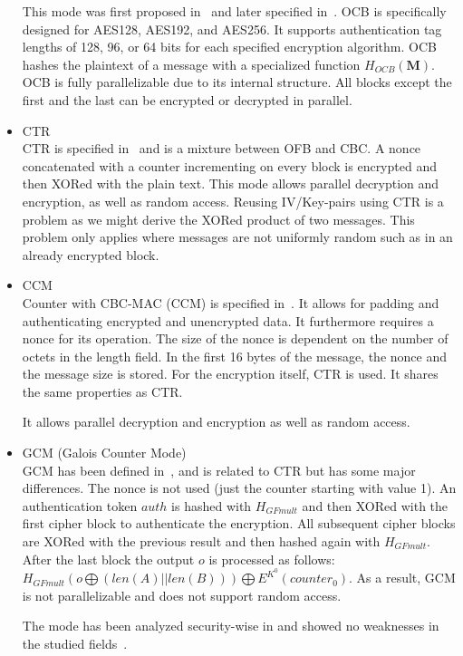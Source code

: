 \begin{itemize}
	This mode was first proposed in~\cite{rogaway2003ocb} and later specified in~\cite{krovetz-ocb-04}. OCB is specifically designed for AES128, AES192, and AES256. It supports authentication tag lengths of 128, 96, or 64 bits for each specified encryption algorithm. OCB hashes the plaintext of a message with a specialized function $H_{OCB}(\mathbf{M})$. OCB is fully parallelizable due to its internal structure. All blocks except the first and the last can be encrypted or decrypted in parallel.
	\item CTR\\
	CTR is specified in~\cite{lipmaa2000ctr} and is a mixture between OFB and CBC. A nonce concatenated with a counter incrementing on every block is encrypted and then XORed with the plain text. This mode allows parallel decryption and encryption, as well as random access. Reusing IV/Key-pairs using CTR is a problem as we might derive the XORed product of two messages. This problem only applies where messages are not uniformly random such as in an already encrypted block.
	\item CCM\\
	Counter with CBC-MAC (CCM) is specified in~\cite{rfc3610}. It allows for padding and authenticating encrypted and unencrypted data. It furthermore requires a nonce for its operation. The size of the nonce is dependent on the number of octets in the length field. In the first 16 bytes of the message, the nonce and the message size is stored. For the encryption itself, CTR is used. It shares the same properties as CTR. 
	
	It allows parallel decryption and encryption as well as random access.
	\item GCM (Galois Counter Mode)\\
	GCM has been defined in~\cite{mcgrew2004galois}, and is related to CTR but has some major differences. The nonce is not used (just the counter starting with value 1). An authentication token $auth$ is hashed with $H_{GFmult}$ and then XORed with the first cipher block to authenticate the encryption. All subsequent cipher blocks are XORed with the previous result and then hashed again with $H_{GFmult}$. After the last block the output $o$ is processed  as follows: $H_{GFmult}(o\bigoplus (len(A)||len(B))) \bigoplus E^{K^0}(counter_0)$. As a result, GCM is not parallelizable and does not support random access.
	
	The mode has been analyzed security-wise in \citeyear{mcgrew2004security} and showed no weaknesses in the studied fields~\cite{mcgrew2004security}. 
	

\end{itemize}
